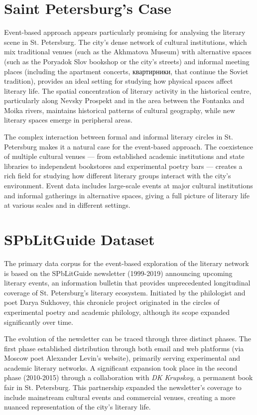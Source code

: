 \documentclass{jcls}
\begin{document}
\section{Saint Petersburg's Case}

Event-based approach appears particularly promising for analysing the literary scene in St. Petersburg. The city's dense network of cultural institutions, which mix traditional venues (such as the Akhmatova Museum) with alternative spaces (such as the Poryadok Slov bookshop or the city's streets) and informal meeting places (including the apartment concerts, квартирники, that continue the Soviet tradition), provides an ideal setting for studying how physical spaces affect literary life. The spatial concentration of literary activity in the historical centre, particularly along Nevsky Prospekt and in the area between the Fontanka and Moika rivers, maintains historical patterns of cultural geography, while new literary spaces emerge in peripheral areas.

The complex interaction between formal and informal literary circles in St. Petersburg makes it a natural case for the event-based approach. The coexistence of multiple cultural venues — from established academic institutions and state libraries to independent bookstores and experimental poetry bars — creates a rich field for studying how different literary groups interact with the city's environment. Event data includes large-scale events at major cultural institutions and informal gatherings in alternative spaces, giving a full picture of literary life at various scales and in different settings.

\section{SPbLitGuide Dataset}

The primary data corpus for the event-based exploration of the literary network is based on the SPbLitGuide newsletter (1999-2019) announcing upcoming literary events, an information bulletin that provides unprecedented longitudinal coverage of St. Petersburg's literary ecosystem. Initiated by the philologist and poet Darya Sukhovey, this chronicle project originated in the circles of experimental poetry and academic philology, although its scope expanded significantly over time. 

The evolution of the newsletter can be traced through three distinct phases. The first phase established distribution through both email and web platforms (via Moscow poet Alexander Levin's website), primarily serving experimental and academic literary networks. A significant expansion took place in the second phase (2010-2015) through a collaboration with \textit{DK Krupskoy}, a permanent book fair in St. Petersburg. This partnership expanded the newsletter's coverage to include mainstream cultural events and commercial venues, creating a more nuanced representation of the city's literary life.
\end{document}
